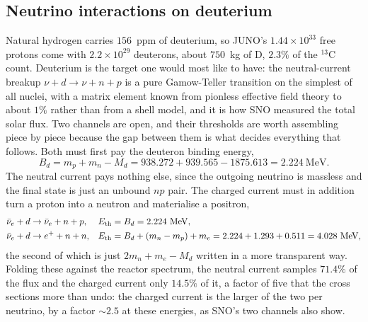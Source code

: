 \documentclass[aps,prd,superscriptaddress,nofootinbib,longbibliography,notitlepage,11pt]{revtex4-2}
\begin{document}
\subsection{Neutrino interactions on deuterium}
\label{sec:deuterium}
Natural hydrogen carries $156$~ppm of deuterium, so JUNO's $1.44\times10^{33}$ free protons
come with $2.2\times10^{29}$ deuterons, about $750$~kg of D, $2.3\%$ of the $^{13}$C count.
Deuterium is the target one would most like to have: the neutral-current breakup
$\nu+d\to\nu+n+p$ is a pure Gamow-Teller transition on the simplest of all nuclei, with a
matrix element known from pionless effective field theory to about $1\%$ rather than from a
shell model, and it is how SNO measured the total solar flux.  Two channels are open, and their thresholds are worth assembling piece by piece because the
gap between them is what decides everything that follows.  Both must first pay the deuteron
binding energy,
\begin{equation}
B_d=m_p+m_n-M_d=938.272+939.565-1875.613=2.224\ \mathrm{MeV}.
\label{eq:bd}
\end{equation}
The neutral current pays nothing else, since the outgoing neutrino is massless and the
final state is just an unbound $np$ pair.  The charged current must in addition turn a
proton into a neutron and materialise a positron,
\begin{align}
\bar\nu_e+d&\to \bar\nu_e+n+p,
&E_{\rm th}&=B_d=2.224\ \mathrm{MeV},
\label{eq:ncd}\\
\bar\nu_e+d&\to e^++n+n,
&E_{\rm th}&=B_d+(m_n-m_p)+m_e=2.224+1.293+0.511=4.028\ \mathrm{MeV},
\label{eq:ccd}
\end{align}
the second of which is just $2m_n+m_e-M_d$ written in a more transparent way.  Folding
these against the reactor spectrum, the neutral current samples $71.4\%$ of the flux and
the charged current only $14.5\%$ of it, a factor of five that the cross sections more than
undo: the charged current is the larger of the two per neutrino, by a factor $\sim2.5$ at
these energies, as SNO's two channels also show.
\end{document}

